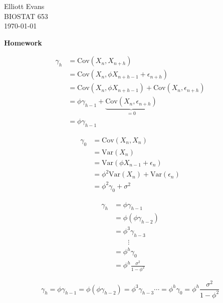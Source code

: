 \documentclass[12pt,letterpaper]{article}
\newcommand{\var}{\text{Var}}
\newcommand{\cov}{\text{Cov}}
\begin{document}
\begin{flushright}
Elliott Evans\\ BIOSTAT 653\\ \today
\end{flushright}

\begin{center}
\LARGE{\textbf{Homework}}
\end{center}

\begin{align*}
\gamma_h &= \cov(X_n,X_{n+h})\\
		 &=\cov(X_n,\phi X_{n+h-1} + \epsilon_{n+h})\\
		 &=\cov(X_n,\phi X_{n+h-1}) + \cov(X_n,\epsilon_{n+h})\\
		 &=\phi\gamma_{h-1} + \underbrace{\cov(X_n,\epsilon_{n+h})}_{=0}\\
		 &=\phi\gamma_{h-1}
\end{align*}

\begin{align*}
\gamma_0 &= \cov(X_n,X_n)\\
		 &=\var(X_n)\\
		 &=\var(\phi X_{n-1} + \epsilon_n)\\
		 &=\phi^2\var(X_n) + \var(\epsilon_n)\\
		 &=\phi^2\gamma_0 + \sigma^2
\end{align*}

\begin{align*}
\gamma_h &= \phi\gamma_{h-1}\\
		 &=\phi(\phi\gamma_{h-2})\\
		 &=\phi^3\gamma_{h-3}\\
		 &\qquad \vdots \\
		 &=\phi^h\gamma_0\\
		 &=\phi^h\frac{\sigma^2}{1-\phi^2}
\end{align*}

$$\gamma_h = \phi\gamma_{h-1}
=\phi(\phi\gamma_{h-2})
=\phi^3\gamma_{h-3}
 \cdots 
=\phi^h\gamma_0
=\phi^h\frac{\sigma^2}{1-\phi^2}$$
\end{document}
